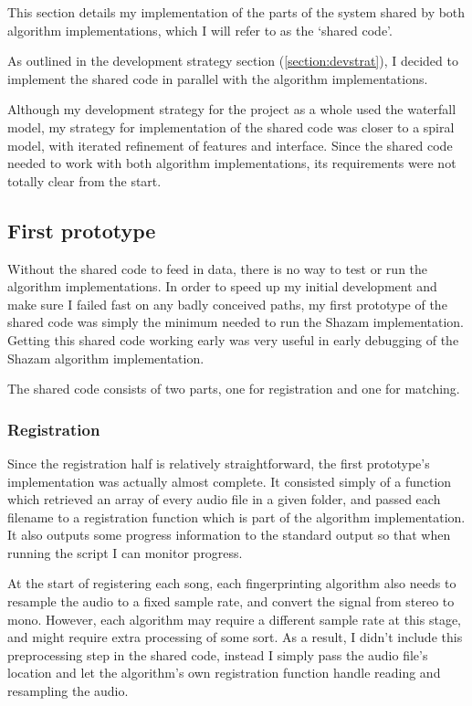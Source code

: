 \documentclass[12pt,a4paper,twoside,openright]{report}
\begin{document}
This section details my implementation of the parts of the system shared by both algorithm implementations, which I will refer to as the `shared code'.

As outlined in the development strategy section (\ref{section:devstrat}), I decided to implement the shared code in parallel with the algorithm implementations.

Although my development strategy for the project as a whole used the waterfall model, my strategy for implementation of the shared code was closer to a spiral model, with iterated refinement of features and interface. Since the shared code needed to work with both algorithm implementations, its requirements were not totally clear from the start. 


\subsection{First prototype}

Without the shared code to feed in data, there is no way to test or run the algorithm implementations. In order to speed up my initial development and make sure I failed fast on any badly conceived paths, my first prototype of the shared code was simply the minimum needed to run the Shazam implementation. Getting this shared code working early was very useful in early debugging of the Shazam algorithm implementation.

The shared code consists of two parts, one for registration and one for matching. 

\subsubsection{Registration}

Since the registration half is relatively straightforward, the first prototype's implementation was actually almost complete. It consisted simply of a function which retrieved an array of every audio file in a given folder, and passed each filename to a registration function which is part of the algorithm implementation. It also outputs some progress information to the standard output so that when running the script I can monitor progress.

At the start of registering each song, each fingerprinting algorithm also needs to resample the audio to a fixed sample rate, and convert the signal from stereo to mono. However, each algorithm may require a different sample rate at this stage, and might require extra processing of some sort. As a result, I didn't include this preprocessing step in the shared code, instead I simply pass the audio file's location and let the algorithm's own registration function handle reading and resampling the audio.
\end{document}
